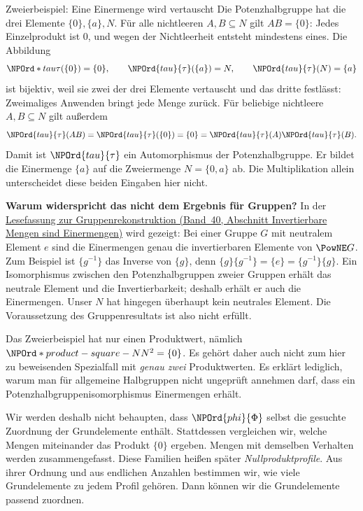 \begin{NPReadingExample}{Zweierbeispiel: Eine Einermenge wird vertauscht}
Die Potenzhalbgruppe hat die drei Elemente \(\{0\},\{a\},N\).
Für alle nichtleeren \(A,B\subseteq N\) gilt \(AB=\{0\}\):
Jedes Einzelprodukt ist \(0\), und wegen der Nichtleerheit entsteht
mindestens eines. Die Abbildung
\[
 \NPOrd*{tau}{\tau}(\{0\})=\{0\},\qquad
 \NPOrd{tau}{\tau}(\{a\})=N,\qquad
 \NPOrd{tau}{\tau}(N)=\{a\}
\]
ist bijektiv, weil sie zwei der drei Elemente vertauscht und das dritte
festlässt: Zweimaliges Anwenden bringt jede Menge zurück.
Für beliebige nichtleere \(A,B\subseteq N\) gilt außerdem
\[
 \NPOrd{tau}{\tau}(AB)=\NPOrd{tau}{\tau}(\{0\})=\{0\}=\NPOrd{tau}{\tau}(A)\NPOrd{tau}{\tau}(B).
\]
Damit ist \(\NPOrd{tau}{\tau}\) ein Automorphismus der Potenzhalbgruppe. Er bildet
die Einermenge \(\{a\}\) auf die Zweiermenge \(N=\{0,a\}\) ab.
Die Multiplikation allein unterscheidet diese beiden Eingaben hier nicht.

\medskip\noindent\textbf{Warum widerspricht das nicht dem Ergebnis für Gruppen?}
In der
\href{../reconstruction/_B40-reconstruction-reading.pdf\#reconstruction.reading.units}%
{Lesefassung zur Gruppenrekonstruktion (Band~40, Abschnitt
\glqq Invertierbare Mengen sind Einermengen\grqq)}
wird gezeigt: Bei einer Gruppe \(G\) mit neutralem Element \(e\)
sind die Einermengen genau die invertierbaren Elemente von \(\PowNE G\).
Zum Beispiel ist \(\{g^{-1}\}\) das Inverse von \(\{g\}\), denn
\(\{g\}\{g^{-1}\}=\{e\}=\{g^{-1}\}\{g\}\).
Ein Isomorphismus zwischen den Potenzhalbgruppen zweier Gruppen erhält
das neutrale Element und die Invertierbarkeit; deshalb erhält er auch
die Einermengen.
Unser \(N\) hat hingegen überhaupt kein neutrales Element.
Die Voraussetzung des Gruppenresultats ist also nicht erfüllt.

Das Zweierbeispiel hat nur einen Produktwert, nämlich \(\NPOrd*{product-square-N}{N^2}=\{0\}\).
Es gehört daher auch nicht zum hier zu beweisenden Spezialfall mit
\emph{genau zwei} Produktwerten. Es erklärt lediglich, warum man für
allgemeine Halbgruppen nicht ungeprüft annehmen darf, dass ein
Potenzhalbgruppenisomorphismus Einermengen erhält.
\end{NPReadingExample}

Wir werden deshalb nicht behaupten, dass \(\NPOrd{phi}{\Phi}\) selbst die gesuchte
Zuordnung der Grundelemente enthält. Stattdessen vergleichen wir,
welche Mengen miteinander das Produkt \(\{0\}\) ergeben. Mengen mit
demselben Verhalten werden zusammengefasst. Diese Familien heißen
später \emph{Nullproduktprofile}. Aus ihrer Ordnung und aus endlichen
Anzahlen bestimmen wir, wie viele Grundelemente zu jedem Profil gehören.
Dann können wir die Grundelemente passend zuordnen.

